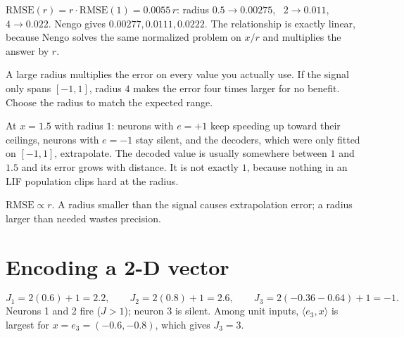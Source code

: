 \documentclass[11pt,letterpaper]{article}
\newcommand{\ans}[1]{\par\vspace{4pt}{\bfseries #1}\quad}
\begin{document}
\ans{Q1}
$\mathrm{RMSE}(r) = r\cdot\mathrm{RMSE}(1) = 0.0055\,r$: radius $0.5 \to 0.00275$, \ $2 \to 0.011$, \ $4 \to 0.022$. Nengo gives $0.00277, 0.0111, 0.0222$. The relationship is exactly linear, because Nengo solves the same normalized problem on $x/r$ and multiplies the answer by $r$.
\begin{center}
\end{center}

\ans{Q2}
A large radius multiplies the error on every value you actually use. If the signal only spans $[-1, 1]$, radius $4$ makes the error four times larger for no benefit. Choose the radius to match the expected range.

At $x = 1.5$ with radius $1$: neurons with $e = +1$ keep speeding up toward their ceilings, neurons with $e = -1$ stay silent, and the decoders, which were only fitted on $[-1, 1]$, extrapolate. The decoded value is usually somewhere between $1$ and $1.5$ and its error grows with distance. It is not exactly $1$, because nothing in an LIF population clips hard at the radius.
\begin{result}
$\mathrm{RMSE} \propto r$. A radius smaller than the signal causes extrapolation error; a radius larger than needed wastes precision.
\end{result}

\section{Encoding a 2-D vector}

\ans{Q1}
\[
J_1 = 2(0.6) + 1 = 2.2, \qquad J_2 = 2(0.8) + 1 = 2.6, \qquad J_3 = 2(-0.36 - 0.64) + 1 = -1.
\]
Neurons 1 and 2 fire ($J > 1$); neuron 3 is silent. Among unit inputs, $\langle e_3, x\rangle$ is largest for $x = e_3 = (-0.6, -0.8)$, which gives $J_3 = 3$.
\end{document}
